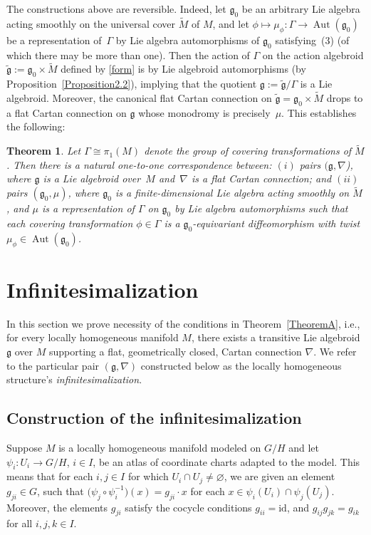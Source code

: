 \documentclass[pdftex]{sigma}
\DeclareMathOperator{\automorphism}{Aut}
\newcommand\identity{\mathrm{id}}
\numberwithin{equation}{section}
\newtheorem{TheoremBlaom}{Theorem}[section]
\begin{document}
The constructions above are reversible. Indeed, let ${\mathfrak g}_0$
be an arbitrary Lie algebra acting smoothly on the universal cover
$\tilde M$ of $M$, and let $\phi \mapsto \mu_\phi \colon \Gamma
\rightarrow \automorphism ({\mathfrak g}_0)$ be a representation of~$\Gamma$ by Lie algebra automorphisms of ${\mathfrak g}_0$ satisfying~(3) %
(of which there may be more than one). Then the action of
$\Gamma$ on the action algebroid $\tilde {\mathfrak g} :={\mathfrak
  g}_0 \times \tilde M$ def\/ined by \eqref{form} is by Lie algebroid
automorphisms (by Proposition~\ref{Proposition2.2}), %
implying that the
quotient ${\mathfrak g}:=\tilde {\mathfrak g} /\Gamma$ is a Lie
algebroid. Moreover, the canonical f\/lat Cartan connection on $\tilde
{\mathfrak g} ={\mathfrak g}_0 \times \tilde M$ drops to a f\/lat Cartan
connection on ${\mathfrak g}$ whose monodromy is precisely~$\mu$. This
establishes the following:

\begin{TheoremBlaom}\label{Theorem2.6}
  Let $\Gamma \cong \pi_1(M)$ denote the group of covering
  transformations of $\tilde M$. Then there is a natural one-to-one
  correspondence between: $(i)$ pairs $({\mathfrak g}, \nabla$), where
  $\mathfrak g$ is a Lie algebroid over~$M$ and~$\nabla$ is a flat
  Cartan connection; and $(ii)$ pairs $({\mathfrak g}_0,\mu)$, where
  ${\mathfrak g}_0$ is a finite-dimensional Lie algebra acting
  smoothly on $\tilde M$, and $\mu$ is a representation of $\Gamma $
  on ${\mathfrak g}_0$ by Lie algebra automorphisms such that each
  covering transformation $\phi \in \Gamma $ is a ${\mathfrak g}_0
  $-equivariant diffeomorphism with twist $\mu_\phi\in
  \automorphism({\mathfrak g}_0)$.
\end{TheoremBlaom}

\section{Inf\/initesimalization}\label{sectionI}
In this section we prove necessity of the conditions in Theorem~\ref{TheoremA},
i.e., for every locally homogeneous manifold $M$, there exists a
transitive Lie algebroid ${\mathfrak g}$ over $M$ supporting a f\/lat,
geometrically closed, Cartan connection $\nabla$. We refer to the
particular pair $({\mathfrak g}, \nabla)$ constructed below as the
locally homogeneous structure's {\it infinitesimalization}.

\subsection{Construction of the
  inf\/initesimalization}\label{infinitesimalization}
Suppose $M$ is a locally homogeneous manifold modeled on $G/H$ and let
$\psi_i \colon U_i \rightarrow G/H$, $i\in I$, be an atlas of
coordinate charts adapted to the model. This means that for each $i,j
\in I$ for which $U_i\cap U_j \ne \varnothing$, we are given an element
$g_{ji}\in G$, such that $\big(\psi_j \circ \psi_i^{-1}\big)(x) = g_{ji}\cdot
x$ for each $x\in \psi_i(U_i)\cap \psi_j(U_j)$. Moreover, the elements
$g_{ji}$ satisfy the cocycle conditions $g_{ii}=\identity$, and
$g_{ij}g_{jk}=g_{ik}$ for all $i,j,k \in I$.
\end{document}
